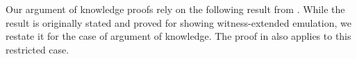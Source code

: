 Our argument of knowledge proofs rely on the following result from \cite{bulletproofs}.
While the result is originally stated and proved for showing witness-extended
emulation, we restate it for the case of argument of knowledge. The proof in
\cite{InnerProductDLS} also applies to this restricted case.
\begin{comment}
\begin{lemma}[Forking Lemma,\cite{bulletproofs}]\label{lem:forkinglemma}
Let $(\setup,\prover,\verifier)$ be a $(2\mu+1)$-round public coin interactive
protocol. Let $\chi$ be a $\ppt$ witness extraction algorithm that outputs a
witness with probability $1-\negl(\secpar)$ from an $(n_1,\ldots,n_\mu)$-tree
of accepting transcripts. Assuming that $\prod_{i=1}^\mu n_i$ is bounded by a
polynomial in security parameter $\secpar$, the protocol
$(\setup,\prover,\verifier)$ is an argument of knowledge.
\end{lemma}
\commentA{change 'move' to 'round' in all the above text.}
\end{comment}
